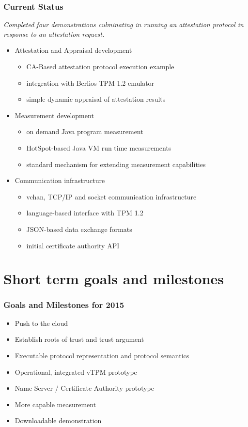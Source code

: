 \documentclass{beamer}
\begin{document}
\begin{frame}
  \frametitle{Current Status}

  \begin{center}
  \emph{\color{kublue}Completed four demonstrations culminating in
    running an attestation protocol in response to an attestation
    request.}
  \end{center}

  \begin{itemize}
  \item Attestation and Appraisal development
    \begin{itemize}
    \item CA-Based attestation protocol execution example
    \item integration with Berlios TPM 1.2 emulator
    \item simple dynamic appraisal of attestation results
    \end{itemize}
  \item Measurement development
    \begin{itemize}
    \item on demand Java program measurement
    \item HotSpot-based Java VM run time measurements
    \item standard mechanism for extending measurement capabilities
    \end{itemize}
  \item Communication infrastructure
    \begin{itemize}
    \item vchan, TCP/IP and socket communication infrastructure
    \item language-based interface with TPM 1.2
    \item JSON-based data exchange formats
    \item initial certificate authority API
    \end{itemize}
  \end{itemize}
\end{frame}

\section{Short term goals and milestones}

\begin{frame}
  \frametitle{Goals and Milestones for 2015}

  \begin{itemize}
  \item Push to the cloud
  \item Establish roots of trust and trust argument
  \item Executable protocol representation and protocol semantics
  \item Operational, integrated vTPM prototype
  \item Name Server / Certificate Authority prototype
  \item More capable measurement
  \item Downloadable demonstration
  \end{itemize}
\end{frame}
\end{document}
